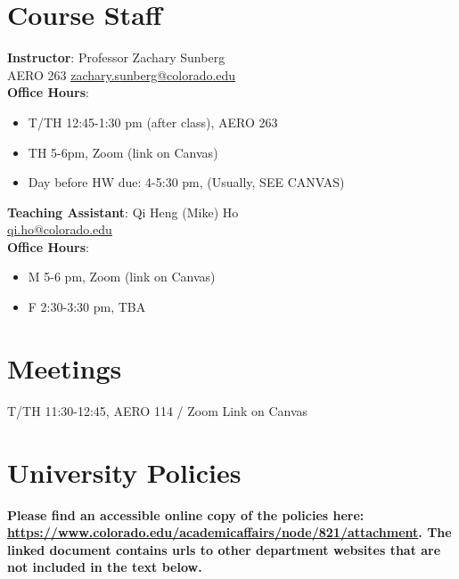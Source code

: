 \documentclass[9pt]{article}
\begin{document}
\section*{Course Staff}

\begin{multicols}{2}
    \begin{minipage}{\columnwidth}
        \textbf{Instructor}: Professor Zachary Sunberg\\
        AERO 263 \href{mailto://zachary.sunberg@colorado.edu}{zachary.sunberg@colorado.edu}\\
        \textbf{Office Hours}:
        \begin{itemize}[nosep]
            \item T/TH 12:45-1:30 pm (after class), AERO 263
            \item TH 5-6pm, Zoom (link on Canvas)
            \item Day before HW due: 4-5:30 pm, (Usually, SEE CANVAS)
        \end{itemize}
    \end{minipage}

    \begin{minipage}{\columnwidth}
        \textbf{Teaching Assistant}: Qi Heng (Mike) Ho\\
        \href{mailto://qi.ho@colorado.edu}{qi.ho@colorado.edu}\\
        \textbf{Office Hours}:
        \begin{itemize}[nosep]
            \item M 5-6 pm, Zoom (link on Canvas)
            \item F 2:30-3:30 pm, TBA
        \end{itemize}
    \end{minipage}
\end{multicols}

\section*{Meetings}

T/TH 11:30-12:45, AERO 114 / Zoom Link on Canvas

\section*{University Policies}

\textbf{Please find an accessible online copy of the policies here: \url{https://www.colorado.edu/academicaffairs/node/821/attachment}. The linked document contains urls to other department websites that are not included in the text below.}
\end{document}
